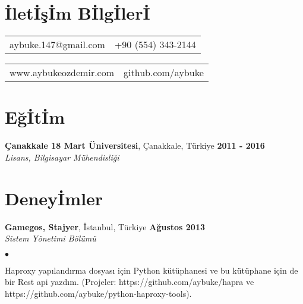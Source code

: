 \documentclass[margin,line]{res}
\newenvironment{list2}{
  \begin{list}{$\bullet$}{%
      \setlength{\itemsep}{0in}
      \setlength{\parsep}{0in} \setlength{\parskip}{0in}
      \setlength{\topsep}{0in} \setlength{\partopsep}{0in}
      \setlength{\leftmargin}{0.1in}}}{\end{list}}
\begin{document}
\small
{}

\begin{resume}
\section{\sc \.{I}let\.{I}\c{s}\.{I}m B\.{I}lg\.{I}ler\.{I}}
\begin{tabular}{@{}p{2in}p{3.8in}}
aybuke.147@gmail.com & {\hfill{\it}  +90 (554) 343-2144} \\
\end{tabular}
\begin{tabular}{@{}p{2in}p{3.8in}}
www.aybukeozdemir.com & {\hfill{\it}  github.com/aybuke} \\
\end{tabular}

\vspace*{-.3cm}
\section{\sc E\u{g}\.{I}t\.{I}m}

{\bf \c{C}anakkale 18 Mart \"{U}niversitesi}, \c{C}anakkale, T\"{u}rkiye  \hfill {\bf 2011 - 2016} \\

\vspace*{-.7cm}
{\em Lisans, Bilgisayar M\"{u}hendisli\u{g}i} \hfill {\ } \\
\vspace*{-.09in}
\vspace*{-.3cm}


\vspace*{-.3cm}
\section{\sc Deney\.{I}mler}

{\bf Gamegos, Stajyer}, \.{I}stanbul, T\"{u}rkiye \hfill {\bf A\u{g}ustos 2013}\\

\vspace{-.7cm}
{\em Sistem Y\"{o}netimi B\"{o}l\"{u}m\"{u} }
\vspace*{+.05in}
\begin{list2}
\item Haproxy yap{\i}land{\i}rma dosyas{\i} i\c{c}in Python k\"{u}t\"{u}phanesi ve bu k\"{u}t\"{u}phane i\c{c}in de bir Rest api yazd{\i}m. (Projeler: https://github.com/aybuke/hapra ve https://github.com/aybuke/python-haproxy-tools).
\end{list2}


\end{resume}
\end{document}
